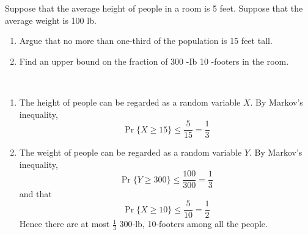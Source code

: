 \begin{exercise}{Suppose that the average height of people in a room is 5 feet. Suppose that the average weight is 100 lb.
  \begin{enumerate}
    \item Argue that no more than one-third of the population is 15 feet tall.
    \item Find an upper bound on the fraction of 300 -Ib 10 -footers in the room.
  \end{enumerate} }
  \begin{solution}
  \par{~}
  \begin{enumerate}
    \item { The height of people can be regarded as a random variable $X$. By Markov’s inequality,
    $$\operatorname{Pr}\{X \geq 15\} \leq \frac{5}{15} = \frac{1}{3}$$
    }
    \item { The weight of people can be regarded as a random variable $Y$. By Markov’s inequality,
    $$\operatorname{Pr}\{Y \geq 300\} \leq \frac{100}{300} = \frac{1}{3}$$}
    and that
    $$\operatorname{Pr}\{X \geq 10\} \leq \frac{5}{10} = \frac{1}{2}$$
    Hence there are at most $\frac{1}{3}$ 300-lb, 10-footers among all the people.
  \end{enumerate}
  \end{solution}
  \label{ex9}
\end{exercise}